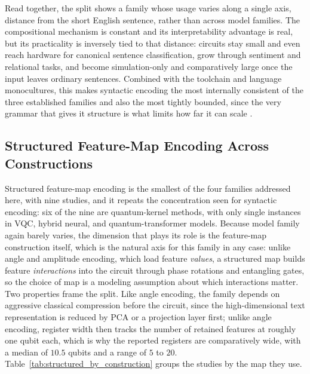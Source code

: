\documentclass{ieeeaccess}
\begin{document}
Read together, the split shows a family whose usage varies along a single axis, distance from the short English sentence, rather than across model families. The compositional mechanism is constant and its interpretability advantage is real, but its practicality is inversely tied to that distance: circuits stay small and even reach hardware for canonical sentence classification, grow through sentiment and relational tasks, and become simulation-only and comparatively large once the input leaves ordinary sentences. Combined with the toolchain and language monocultures, this makes syntactic encoding the most internally consistent of the three established families and also the most tightly bounded, since the very grammar that gives it structure is what limits how far it can scale \cite{sreedhar_towards_2025,uotila_sql2circuits_2025}.

\subsection{Structured Feature-Map Encoding Across Constructions}
\label{subsec:structured_across_constructions}

Structured feature-map encoding is the smallest of the four families addressed here, with nine studies, and it repeats the concentration seen for syntactic encoding: six of the nine are quantum-kernel methods, with only single instances in VQC, hybrid neural, and quantum-transformer models. Because model family again barely varies, the dimension that plays its role is the feature-map construction itself, which is the natural axis for this family in any case: unlike angle and amplitude encoding, which load feature \emph{values}, a structured map builds feature \emph{interactions} into the circuit through phase rotations and entangling gates, so the choice of map is a modeling assumption about which interactions matter. Two properties frame the split. Like angle encoding, the family depends on aggressive classical compression before the circuit, since the high-dimensional text representation is reduced by PCA or a projection layer first; unlike angle encoding, register width then tracks the number of retained features at roughly one qubit each, which is why the reported registers are comparatively wide, with a median of $10.5$ qubits and a range of $5$ to $20$. Table~\ref{tab:structured_by_construction} groups the studies by the map they use.
\end{document}
